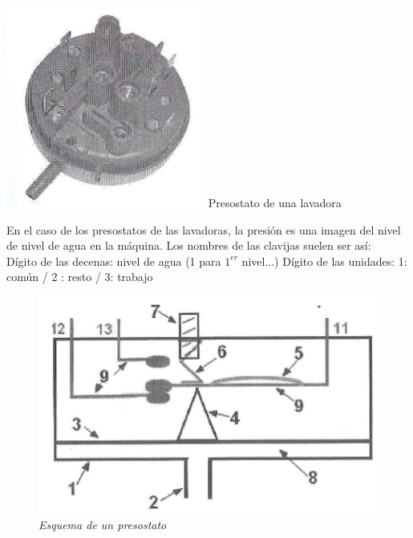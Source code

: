 \documentclass[a5paper,twoside,openany]{book}
\begin{document}
\noindent\begin{minipage}[t]{0.4\textwidth}\vspace{0pt}
\includegraphics[width=\linewidth]{sensor-presion}
Presostato de una lavadora
\end{minipage}
\hfill%
\begin{minipage}[t]{0.5\textwidth}\vspace{\fill}
\vspace{\fill}
En el caso de los presostatos de las
lavadoras, la presión es una imagen del nivel de
nivel de agua en la máquina.
Los nombres de las clavijas suelen ser
así:
\\

Dígito de las decenas: nivel de agua (1 para
$1^{er}$ nivel...)
Dígito de las unidades: 1: común / 2 :
resto / 3: trabajo\\
\vspace{\fill}
\end{minipage}
\vspace{1em}

\begin{figure}[h]
\centering
\includegraphics[width=0.6\linewidth]{esquema-presostato}
\caption*{\textit{Esquema de un presostato}}
\end{figure}
\end{document}
